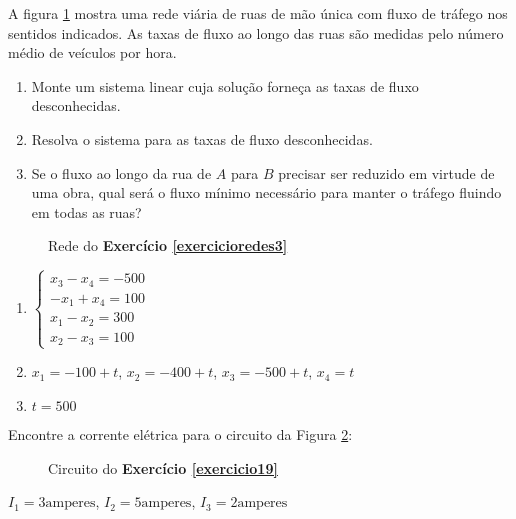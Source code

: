 \documentclass[12pt]{exam}
\begin{document}
\begin{exercicio}\label{exercicioredes3}
  A figura \ref{exercicio3redesanton} mostra uma rede viária de ruas de mão única com fluxo de tráfego nos sentidos indicados. As taxas
  de fluxo ao longo das ruas são medidas pelo número médio de veículos por hora.
  \begin{enumerate}[label={\alph*})]
    \item Monte um sistema linear cuja solução forneça as taxas de fluxo desconhecidas.
    \item Resolva o sistema para as taxas de fluxo desconhecidas.
    \item Se o fluxo ao longo da rua de $A$ para $B$ precisar ser reduzido em virtude de uma obra, qual será o fluxo mínimo necessário para manter o tráfego fluindo em todas as ruas?
  \end{enumerate}
  \begin{figure}[!h]
    \centering
    
    \caption{Rede do \textbf{Exercício \ref{exercicioredes3}}}
    \label{exercicio3redesanton}
  \end{figure}
  \begin{solucao}
    \begin{enumerate}
      \item $\begin{cases}x_3 - x_4 = -500\\-x_1 + x_4 = 100\\x_1 - x_2 = 300\\x_2 - x_3 = 100\end{cases}$
      \item $x_1 = -100 +t$, $x_2 = -400 + t$, $x_3 = -500 + t$, $x_4 = t$
      \item $t = 500$
    \end{enumerate}
  \end{solucao}
\end{exercicio}

\newpage

\begin{exercicio}\label{exercicio19}
  Encontre a corrente elétrica para o circuito da Figura \ref{exercicio19circuitopoole}:
    \begin{figure}[!h]
      \centering
      
      \caption{Circuito do \textbf{Exercício \ref{exercicio19}}}
    \label{exercicio19circuitopoole}
    \end{figure}

  \begin{solucao}
    $I_1 = 3 \mbox{amperes}$,
    $I_2 = 5 \mbox{amperes}$,
    $I_3 = 2 \mbox{amperes}$
  \end{solucao}
\end{exercicio}
\end{document}
